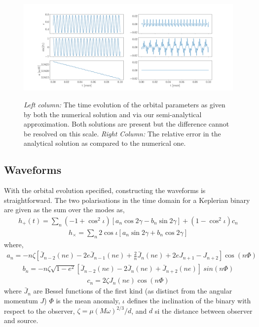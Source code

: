 \documentclass[a4paper,fleqn,usenatbib]{mnras}
\begin{document}
\begin{figure}
	\includegraphics[width=1\textwidth]{compare_canonical1.png} \\ 
	\medskip
	\caption{\textit{Left column:} The time evolution of the orbital parameters as given by both the numerical solution and via our semi-analytical approximation. Both solutions are present but the difference cannot be resolved on this scale. \textit{Right Column:} The relative error in the analytical solution as compared to the numerical one.}
	\label{fig:compare_canonical}
\end{figure}





\subsection{Waveforms}
With the orbital evolution specified, constructing the waveforms is straightforward. The two polarisations in the time domain for a Keplerian binary are given as the sum over the modes as,
\begin{eqnarray}
h_{+} (t)= \sum_n (-1 + \cos^2 \iota) \left[a_n \cos 2 \gamma -b_n \sin2 \gamma\right] + (1-\cos^2 \iota) c_n
\end{eqnarray}
\begin{eqnarray}
h_{\times} = \sum_n 2 \cos \iota \left[ a_n \sin 2 \gamma + b_n \cos 2 \gamma\right]
\end{eqnarray}
where,
\begin{eqnarray}
a_n = -n\zeta [\bar{J}_{n-2}(ne) - 2e\bar{J}_{n-1}(ne) + \frac{2}{n} \bar{J}_n (ne) + 2eJ_{n+1} - J_{n+2}]\cos(n\Phi)
\end{eqnarray}
\begin{eqnarray}
b_n = -n\zeta \sqrt{1-e^2}  [\bar{J}_{n-2}(ne) - 2\bar{J}_n(ne) + \bar{J}_{n+2}(ne)] \ sin(n \Phi)
\end{eqnarray}
\begin{eqnarray}
c_n = 2 \zeta J_n(ne) \cos(n \Phi)
\end{eqnarray}
where $\bar{J}_n$ are Bessel functions of the first kind (as distinct from the angular momentum $J$)
$\Phi$ is the mean anomaly, $\iota$ defines the inclination of the binary with respect to the observer,  $\zeta = \mu (M \omega)^{2/3} / d$, and $d$ si the distance between observer and source.  \newline 
\end{document}
